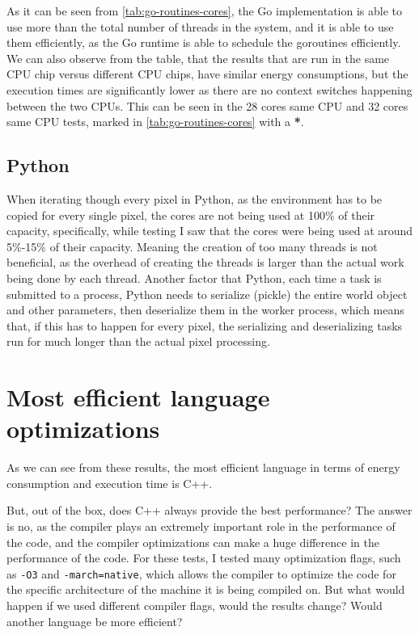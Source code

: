 

As it can be seen from \autoref{tab:go-routines-cores}, the Go implementation is able to use more than the total number of threads in the system, and it is able to use them efficiently, as the Go runtime is able to schedule the goroutines efficiently. We can also observe from the table, that the results that are run in the same CPU chip versus different CPU chips, have similar energy consumptions, but the execution times are significantly lower as there are no context switches happening between the two CPUs. This can be seen in the 28 cores same CPU and 32 cores same CPU tests, marked in \autoref{tab:go-routines-cores} with a \textbf{*}.

\subsection{Python}
When iterating though every pixel in Python, as the environment has to be copied for every single pixel, the cores are not being used at 100\% of their capacity, specifically, while testing I saw that the cores were being used at around 5\%-15\% of their capacity. Meaning the creation of too many threads is not beneficial, as the overhead of creating the threads is larger than the actual work being done by each thread. 
Another factor that Python, each time a task is submitted to a process, Python needs to serialize (pickle) the entire world object and other parameters, then deserialize them in the worker process, which means that, if this has to happen for every pixel, the serializing and deserializing tasks run for much longer than the actual pixel processing.

\section{Most efficient language optimizations}
As we can see from these results, the most efficient language in terms of energy consumption and execution time is C++. 

But, out of the box, does C++ always provide the best performance? The answer is no, as the compiler plays an extremely important role in the performance of the code, and the compiler optimizations can make a huge difference in the performance of the code.
For these tests, I tested many optimization flags, such as \texttt{-O3} and \texttt{-march=native}, which allows the compiler to optimize the code for the specific architecture of the machine it is being compiled on. But what would happen if we used different compiler flags, would the results change? Would another language be more efficient?


